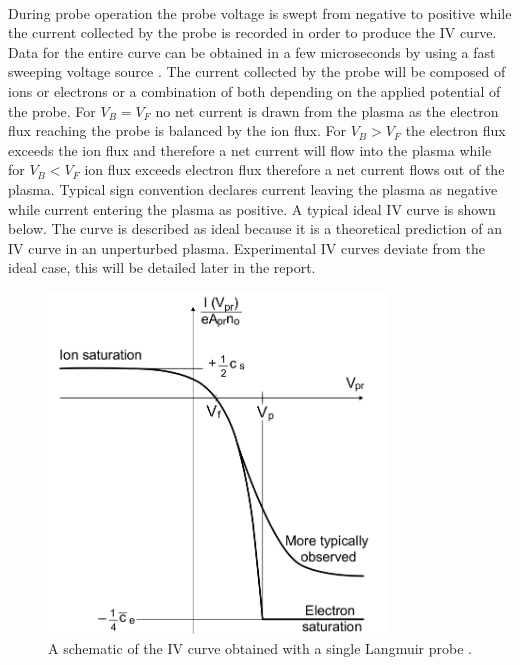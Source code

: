 \documentclass[12pt]{article}
\begin{document}
\paragraph{}
During probe operation the probe voltage is swept from negative to positive while the current collected by the probe is recorded in order to produce the IV curve. Data for the entire curve can be obtained in a few microseconds by using a fast sweeping voltage source \cite{chen-notes}. The current collected by the probe will be composed of ions or electrons or a combination of both depending on the applied potential of the probe. For $V_B = V_F$ no net current is drawn from the plasma as the electron flux reaching the probe is balanced by the ion flux. For $V_B > V_F$ the electron flux exceeds the ion flux and therefore a net current will flow into the plasma while for $V_B <V_F$ ion flux exceeds electron flux therefore a net current flows out of the plasma. Typical sign convention declares current leaving the plasma as negative while current entering the plasma as positive. A typical ideal IV curve is shown below. The curve is described as ideal because it is a theoretical prediction of an IV curve in an unperturbed plasma. Experimental IV curves deviate from the ideal case, this will be detailed later in the report.
\begin{figure}[H]
\centering
\includegraphics[width=0.8\textwidth]{monkiv}
\caption{A schematic of the IV curve obtained with a single Langmuir probe \cite{monk}.}
\label{circuit}
\end{figure}
\end{document}
